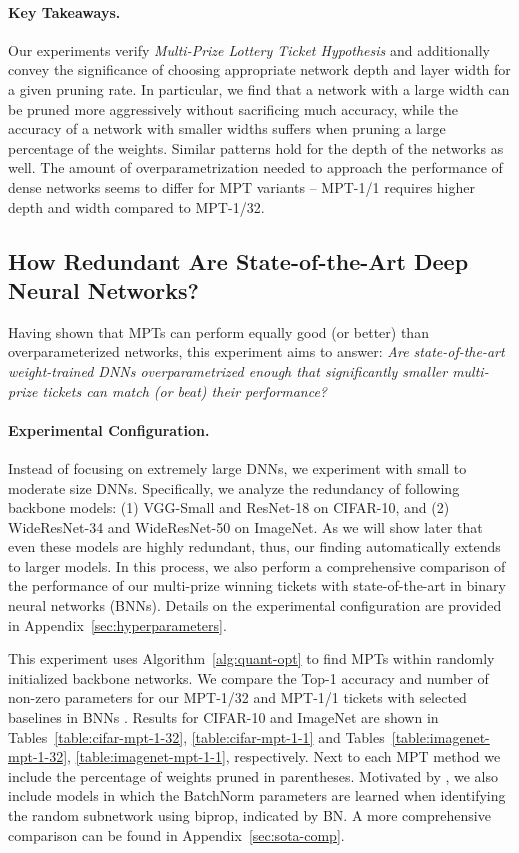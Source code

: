 \documentclass{article} \usepackage{iclr2021_conference,times}
\begin{document}
\paragraph{Key Takeaways.}
Our experiments verify \textit{Multi-Prize Lottery Ticket Hypothesis} and additionally convey the significance of choosing appropriate network depth and layer width for a given pruning rate. In particular, we find that a network with a large width can be pruned more aggressively without sacrificing much accuracy, while the accuracy of a network with smaller widths suffers when pruning a large percentage of the weights. Similar patterns hold for the depth of the networks as well. The amount of overparametrization needed to approach the performance of dense networks seems to differ for MPT variants -- MPT-1/1 requires higher depth and width compared to MPT-1/32.




\subsection{How Redundant Are State-of-the-Art Deep Neural Networks?} \label{sec:exp-sota}

Having shown that MPTs can perform equally good (or better) than overparameterized networks, this experiment aims to answer: \emph{Are state-of-the-art weight-trained DNNs overparametrized enough that significantly smaller multi-prize tickets can match (or beat) their performance?}




\paragraph{Experimental Configuration.}
Instead of focusing on extremely large DNNs, we experiment with small to moderate size DNNs. Specifically, we analyze the redundancy of following backbone models: (1) VGG-Small and ResNet-18 on CIFAR-10, and (2) WideResNet-34 and WideResNet-50 on ImageNet. As we will show later that even these models are highly redundant, thus, our finding automatically extends to larger models. In this process, we also perform a comprehensive comparison of the performance of our multi-prize winning tickets with state-of-the-art in binary neural networks (BNNs). Details on the experimental configuration are provided in Appendix~\ref{sec:hyperparameters}.


This experiment uses Algorithm~\ref{alg:quant-opt} to find MPTs within randomly initialized backbone networks. We compare the Top-1 accuracy and number of non-zero parameters for our MPT-1/32 and MPT-1/1 tickets with selected baselines in BNNs \citep{qin2020binary}. 
Results for CIFAR-10 and ImageNet are shown in  Tables~\ref{table:cifar-mpt-1-32}, \ref{table:cifar-mpt-1-1} and Tables~\ref{table:imagenet-mpt-1-32}, \ref{table:imagenet-mpt-1-1}, respectively.
Next to each MPT method we include the percentage of weights pruned in parentheses. Motivated by \citep{frankle2020training}, we also include models in which the BatchNorm parameters are learned when identifying the random subnetwork using biprop, indicated by BN. A more comprehensive comparison can be found in Appendix~\ref{sec:sota-comp}.
\end{document}
